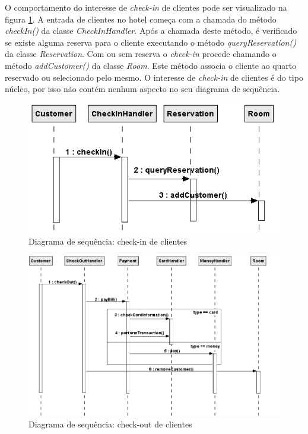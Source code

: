 O comportamento do interesse de \textit{check-in} de clientes pode ser visualizado na figura \ref{fig:case_study_behavioral_check_in}. A entrada de
clientes no hotel começa com a chamada do método \textit{checkIn()} da classe \textit{CheckInHandler}. Após a chamada deste método, é verificado se
existe alguma reserva para o cliente executando o método \textit{queryReservation()} da classe \textit{Reservation}. Com ou sem reserva o
\textit{check-in} procede chamando o método \textit{addCustomer()} da classe \textit{Room}. Este método associa o cliente ao quarto reservado ou
selecionado pelo mesmo. O interesse de \textit{check-in} de clientes é do tipo núcleo, por isso não contém nenhum aspecto no seu diagrama de
sequência.

  \begin{figure}[!h]
	\centering
	\includegraphics{img/case_study_behavioral_check_in.png}
	\caption{Diagrama de sequência: check-in de clientes}\label{fig:case_study_behavioral_check_in}
  \end{figure}

  \begin{figure}[!h]
	\centering
	\includegraphics[scale=0.8]{img/case_study_behavioral_check_out.png}
	\caption{Diagrama de sequência: check-out de clientes}\label{fig:case_study_behavioral_check_out}
  \end{figure}

